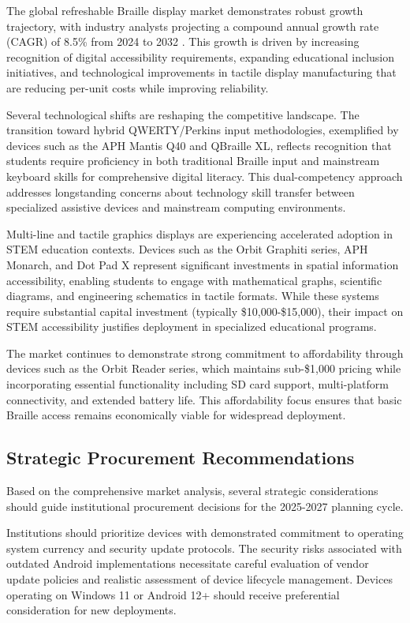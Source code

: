 The global refreshable Braille display market demonstrates robust growth trajectory, with industry analysts projecting a compound annual growth rate (CAGR) of 8.5\% from 2024 to 2032 \supercite{BrailleMarketResearch}. This growth is driven by increasing recognition of digital accessibility requirements, expanding educational inclusion initiatives, and technological improvements in tactile display manufacturing that are reducing per-unit costs while improving reliability.

Several technological shifts are reshaping the competitive landscape. The transition toward hybrid QWERTY/Perkins input methodologies, exemplified by devices such as the APH Mantis Q40 and QBraille XL, reflects recognition that students require proficiency in both traditional Braille input and mainstream keyboard skills for comprehensive digital literacy. This dual-competency approach addresses longstanding concerns about technology skill transfer between specialized assistive devices and mainstream computing environments.

Multi-line and tactile graphics displays are experiencing accelerated adoption in STEM education contexts. Devices such as the Orbit Graphiti series, APH Monarch, and Dot Pad X represent significant investments in spatial information accessibility, enabling students to engage with mathematical graphs, scientific diagrams, and engineering schematics in tactile formats. While these systems require substantial capital investment (typically \$10,000-\$15,000), their impact on STEM accessibility justifies deployment in specialized educational programs.

The market continues to demonstrate strong commitment to affordability through devices such as the Orbit Reader series, which maintains sub-\$1,000 pricing while incorporating essential functionality including SD card support, multi-platform connectivity, and extended battery life. This affordability focus ensures that basic Braille access remains economically viable for widespread deployment.

\subsection{Strategic Procurement Recommendations}\label{ch3:ssec:procurement-strategy}
Based on the comprehensive market analysis, several strategic considerations should guide institutional procurement decisions for the 2025-2027 planning cycle.

Institutions should prioritize devices with demonstrated commitment to operating system currency and security update protocols. The security risks associated with outdated Android implementations necessitate careful evaluation of vendor update policies and realistic assessment of device lifecycle management. Devices operating on Windows 11 or Android 12+ should receive preferential consideration for new deployments.

